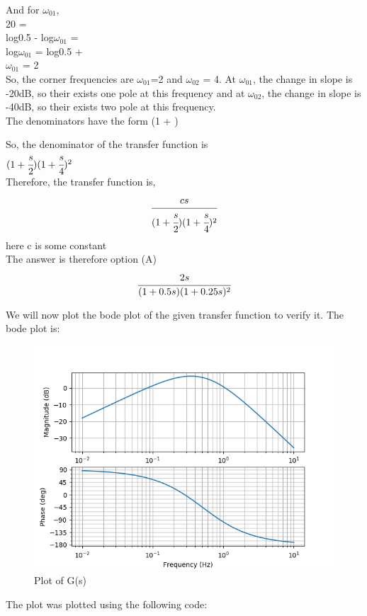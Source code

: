 \begin{enumerate}[label=\thesection.\arabic*.,ref=\thesection.\theenumi]
And for $\omega_{01}$,\\
20 = \\
log0.5 - log$\omega_{01}$ = \\
log$\omega_{01}$ = log0.5 + \\
$\omega_{01}$ = 2\\
So, the corner frequencies are $\omega_{01}$=2 and $\omega_{02}$ = 4.
At $\omega_{01}$, the change in slope is -20dB, so their exists one pole at this frequency and at $\omega_{02}$, the change in slope is -40dB, so their exists two pole at this frequency.\\
The denominators have the form (1 + )

So, the denominator of the transfer function is\\ $(1 + \cfrac{s}{2})(1 + \cfrac{s}{4})^2$\\
Therefore, the transfer function is,
\begin{align*}
    \cfrac{cs}{(1 + \cfrac{s}{2})(1 + \cfrac{s}{4})^2} 
\end{align*}
here c is some constant\\
The answer is therefore option (A)
\begin{align*}
     \cfrac{2s}{(1+0.5s)(1+0.25s)^2}
\end{align*}{}

We will now plot the bode plot of the given transfer function to verify it.
The bode plot is:
\begin{center}
    \begin{figure}[!h]
    \centering
    \includegraphics[width=\columnwidth]{./figs/ep18btech11016_fig2.png}
    \caption{Plot of G(s)}
    \label{fig:ep18btech11016_fig2}
    \end{figure}
\end{center}
The plot was plotted using the following code:


\end{enumerate}
